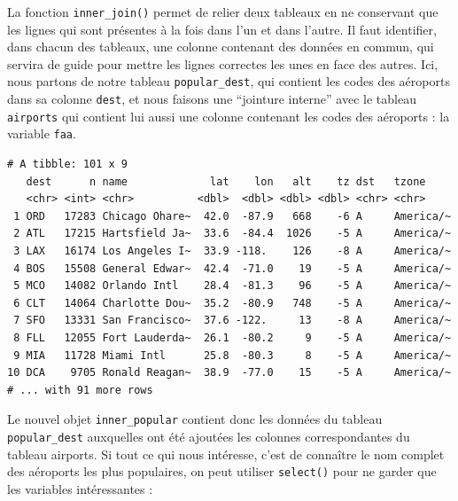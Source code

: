 \documentclass[
  a4paper,
]{article}
\newenvironment{Shaded}{\begin{snugshade}}{\end{snugshade}}
\newcommand{\DataTypeTok}[1]{\textcolor[rgb]{0.00,0.34,0.68}{#1}}
\newcommand{\KeywordTok}[1]{\textcolor[rgb]{0.12,0.11,0.11}{\textbf{#1}}}
\newcommand{\NormalTok}[1]{\textcolor[rgb]{0.12,0.11,0.11}{#1}}
\newcommand{\OperatorTok}[1]{\textcolor[rgb]{0.12,0.11,0.11}{#1}}
\newcommand{\StringTok}[1]{\textcolor[rgb]{0.75,0.01,0.01}{#1}}
\begin{document}
La fonction \texttt{inner\_join()} permet de relier deux tableaux en ne conservant que les lignes qui sont présentes à la fois dans l'un et dans l'autre. Il faut identifier, dans chacun des tableaux, une colonne contenant des données en commun, qui servira de guide pour mettre les lignes correctes les unes en face des autres. Ici, nous partons de notre tableau \texttt{popular\_dest}, qui contient les codes des aéroports dans sa colonne \texttt{dest}, et nous faisons une ``jointure interne'' avec le tableau \texttt{airports} qui contient lui aussi une colonne contenant les codes des aéroports : la variable \texttt{faa}.

\begin{Shaded}
\end{Shaded}

\begin{verbatim}
# A tibble: 101 x 9
   dest      n name             lat    lon   alt    tz dst   tzone    
   <chr> <int> <chr>          <dbl>  <dbl> <dbl> <dbl> <chr> <chr>    
 1 ORD   17283 Chicago Ohare~  42.0  -87.9   668    -6 A     America/~
 2 ATL   17215 Hartsfield Ja~  33.6  -84.4  1026    -5 A     America/~
 3 LAX   16174 Los Angeles I~  33.9 -118.    126    -8 A     America/~
 4 BOS   15508 General Edwar~  42.4  -71.0    19    -5 A     America/~
 5 MCO   14082 Orlando Intl    28.4  -81.3    96    -5 A     America/~
 6 CLT   14064 Charlotte Dou~  35.2  -80.9   748    -5 A     America/~
 7 SFO   13331 San Francisco~  37.6 -122.     13    -8 A     America/~
 8 FLL   12055 Fort Lauderda~  26.1  -80.2     9    -5 A     America/~
 9 MIA   11728 Miami Intl      25.8  -80.3     8    -5 A     America/~
10 DCA    9705 Ronald Reagan~  38.9  -77.0    15    -5 A     America/~
# ... with 91 more rows
\end{verbatim}

Le nouvel objet \texttt{inner\_popular} contient donc les données du tableau \texttt{popular\_dest} auxquelles ont été ajoutées les colonnes correspondantes du tableau airports. Si tout ce qui nous intéresse, c'est de connaître le nom complet des aéroports les plus populaires, on peut utiliser \texttt{select()} pour ne garder que les variables intéressantes :
\end{document}
